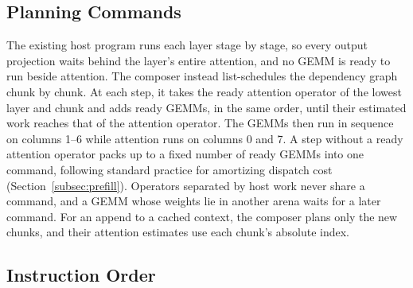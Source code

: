 \subsection{Planning Commands}
\label{subsec:plan}

The existing host program runs each layer stage by stage, so every output projection waits behind the layer's entire attention, and no GEMM is ready to run beside attention.
The composer instead list-schedules the dependency graph chunk by chunk.
At each step, it takes the ready attention operator of the lowest layer and chunk and adds ready GEMMs, in the same order, until their estimated work reaches that of the attention operator.
The GEMMs then run in sequence on columns 1--6 while attention runs on columns 0 and 7.
A step without a ready attention operator packs up to a fixed number of ready GEMMs into one command, following standard practice for amortizing dispatch cost (Section~\ref{subsec:prefill}).
Operators separated by host work never share a command, and a GEMM whose weights lie in another arena waits for a later command.
For an append to a cached context, the composer plans only the new chunks, and their attention estimates use each chunk's absolute index.

\subsection{Instruction Order}
\label{subsec:order}

